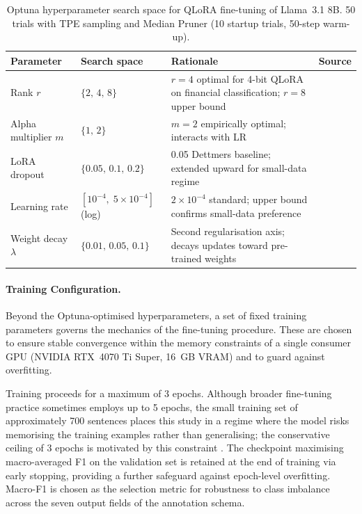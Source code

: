 \begin{table}[ht]
\centering
\caption{Optuna hyperparameter search space for QLoRA fine-tuning of Llama~3.1 8B.
         50 trials with TPE sampling and Median Pruner (10 startup trials,
         50-step warm-up).}
\label{tab:optuna_search}
\begin{tabular}{p{3.2cm} p{3.6cm} p{4.8cm} p{2.5cm}}
\toprule
\textbf{Parameter} & \textbf{Search space} & \textbf{Rationale} & \textbf{Source} \\
\midrule
Rank $r$
  & $\{2,\, 4,\, 8\}$
  & $r=4$ optimal for 4-bit QLoRA on financial classification; $r=8$ upper bound
  & \citet{finlora2024} \\[4pt]
Alpha multiplier $m$
  & $\{1,\, 2\}$
  & $m=2$ empirically optimal; interacts with LR
  & \citet{raschka2023lora} \\[4pt]
LoRA dropout
  & $\{0.05,\, 0.1,\, 0.2\}$
  & 0.05 Dettmers baseline; extended upward for small-data regime
  & \citet{dettmers2023qlora} \\[4pt]
Learning rate
  & $[10^{-4},\; 5{\times}10^{-4}]$ (log)
  & $2{\times}10^{-4}$ standard; upper bound confirms small-data preference
  & \citet{dettmers2023qlora, finlora2024} \\[4pt]
Weight decay $\lambda$
  & $\{0.01,\, 0.05,\, 0.1\}$
  & Second regularisation axis; decays updates toward pre-trained weights
  & \citet{hu2021lora} \\
\bottomrule
\end{tabular}
\end{table}

\paragraph{Training Configuration.}

Beyond the Optuna-optimised hyperparameters, a set of fixed training parameters
governs the mechanics of the fine-tuning procedure. These are chosen to ensure
stable convergence within the memory constraints of a single consumer GPU
(NVIDIA RTX~4070 Ti Super, 16~GB VRAM) and to guard against overfitting.

Training proceeds for a maximum of 3 epochs. Although broader fine-tuning
practice sometimes employs up to 5 epochs, the small training set of
approximately 700 sentences places this study in a regime where the model risks
memorising the training examples rather than generalising; the conservative
ceiling of 3 epochs is motivated by this constraint
\citep{dettmers2023qlora, finlora2024}. The checkpoint maximising macro-averaged
F1 on the validation set is retained at the end of training via early stopping,
providing a further safeguard against epoch-level overfitting. Macro-F1 is
chosen as the selection metric for robustness to class imbalance across the seven
output fields of the annotation schema.

